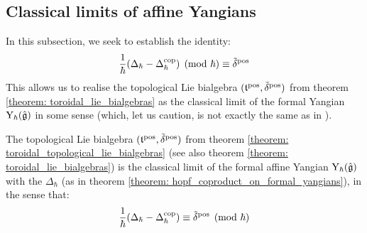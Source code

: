     \subsection{Classical limits of affine Yangians}
        In this subsection, we seek to establish the identity:
            $$\frac{1}{\hbar}(\Delta_{\hbar} - \Delta_{\hbar}^{\mathrm{cop}}) \pmod{\hbar} \equiv \tilde{\delta}^{\mathrm{pos}}$$
        This allows us to realise the topological Lie bialgebra $(\mathfrak{t}^{\mathrm{pos}}, \tilde{\delta}^{\mathrm{pos}})$ from theorem \ref{theorem: toroidal_lie_bialgebras} as the classical limit of the formal Yangian $\mathrm{Y}_{\hbar}(\hat{\mathfrak{g}})$ in some sense (which, let us caution, is not exactly the same as in \cite{etingof_kazhdan_quantisation_1}).
    
        \begin{theorem} \label{theorem: toroidal_lie_algebras_as_classical_limits_of_formal_affine_yangians}
           The topological Lie bialgebra $(\mathfrak{t}^{\mathrm{pos}}, \tilde{\delta}^{\mathrm{pos}})$ from theorem \ref{theorem: toroidal_topological_lie_bialgebras} (see also theorem \ref{theorem: toroidal_lie_bialgebras}) is the classical limit of the formal affine Yangian $\mathrm{Y}_{\hbar}(\hat{\mathfrak{g}})$ with the  $\Delta_{\hbar}$ (as in theorem \ref{theorem: hopf_coproduct_on_formal_yangians}), in the sense that:
                $$\frac{1}{\hbar}( \Delta_{\hbar} - \Delta_{\hbar}^{\mathrm{cop}} ) \equiv \tilde{\delta}^{\mathrm{pos}} \pmod{\hbar}$$
        \end{theorem}
